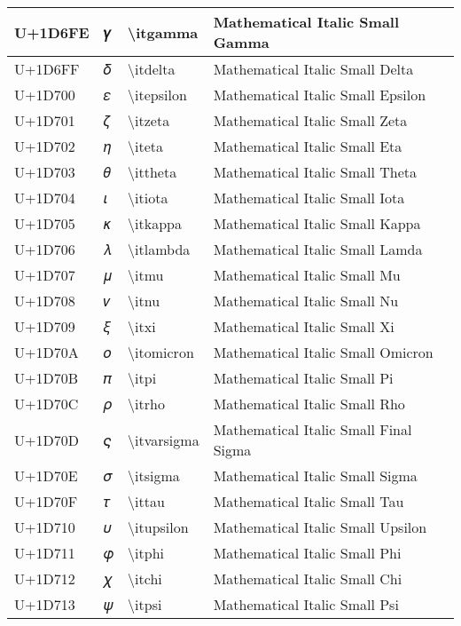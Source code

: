 \begin{table}[h]
\begin{tabulary}{\linewidth}{|L|L|L|L|}
\hline
U+1D6FE & 𝛾 & {\textbackslash}itgamma & Mathematical Italic Small Gamma \\
\hline
U+1D6FF & 𝛿 & {\textbackslash}itdelta & Mathematical Italic Small Delta \\
\hline
U+1D700 & 𝜀 & {\textbackslash}itepsilon & Mathematical Italic Small Epsilon \\
\hline
U+1D701 & 𝜁 & {\textbackslash}itzeta & Mathematical Italic Small Zeta \\
\hline
U+1D702 & 𝜂 & {\textbackslash}iteta & Mathematical Italic Small Eta \\
\hline
U+1D703 & 𝜃 & {\textbackslash}ittheta & Mathematical Italic Small Theta \\
\hline
U+1D704 & 𝜄 & {\textbackslash}itiota & Mathematical Italic Small Iota \\
\hline
U+1D705 & 𝜅 & {\textbackslash}itkappa & Mathematical Italic Small Kappa \\
\hline
U+1D706 & 𝜆 & {\textbackslash}itlambda & Mathematical Italic Small Lamda \\
\hline
U+1D707 & 𝜇 & {\textbackslash}itmu & Mathematical Italic Small Mu \\
\hline
U+1D708 & 𝜈 & {\textbackslash}itnu & Mathematical Italic Small Nu \\
\hline
U+1D709 & 𝜉 & {\textbackslash}itxi & Mathematical Italic Small Xi \\
\hline
U+1D70A & 𝜊 & {\textbackslash}itomicron & Mathematical Italic Small Omicron \\
\hline
U+1D70B & 𝜋 & {\textbackslash}itpi & Mathematical Italic Small Pi \\
\hline
U+1D70C & 𝜌 & {\textbackslash}itrho & Mathematical Italic Small Rho \\
\hline
U+1D70D & 𝜍 & {\textbackslash}itvarsigma & Mathematical Italic Small Final Sigma \\
\hline
U+1D70E & 𝜎 & {\textbackslash}itsigma & Mathematical Italic Small Sigma \\
\hline
U+1D70F & 𝜏 & {\textbackslash}ittau & Mathematical Italic Small Tau \\
\hline
U+1D710 & 𝜐 & {\textbackslash}itupsilon & Mathematical Italic Small Upsilon \\
\hline
U+1D711 & 𝜑 & {\textbackslash}itphi & Mathematical Italic Small Phi \\
\hline
U+1D712 & 𝜒 & {\textbackslash}itchi & Mathematical Italic Small Chi \\
\hline
U+1D713 & 𝜓 & {\textbackslash}itpsi & Mathematical Italic Small Psi \\

\end{tabulary}
\end{table}
